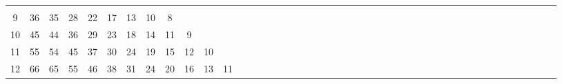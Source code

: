 \documentclass[12pt,a4paper]{amsart}
\theoremstyle{definition} %
\theoremstyle{plain} %
\begin{document}
\begin{table}[h]
{\begin{tabular}{|c|*{44}{c|}}
                               &             &             &             &             &             &             &             &             &             &             &             &             &             &             &             &             &             &             &             &             &             &             &             &             &             &             &             \\
                     9 &         36 &         35 &         28 &         22 &         17 &         13 &         10 &          8 &            &             &             &             &             &             &             &             &   
                               &             &             &             &             &             &             &             &             &             &             &             &             &             &             &             &             &             &             &             &             &             &             &             &             &             &             &             \\
                    10 &         45 &         44 &         36 &         29 &         23 &         18 &         14 &         11 &          9 &             &             &             &             &             &             &             &   
                              &             &             &             &             &             &             &             &             &             &             &             &             &             &             &             &             &             &             &             &             &             &             &             &             &             &             &             \\
                    11 &         55 &         54 &         45 &         37 &         30 &         24 &         19 &         15 &         12 &          10 &             &             &             &             &             &             &   
                              &             &             &             &             &             &             &             &             &             &             &             &             &             &             &             &             &             &             &             &             &             &             &             &             &             &             &             \\
                    12 &         66 &         65 &         55 &         46 &         38 &         31 &         24 &         20 &         16 &          13 &          11 &             &             &             &             &             &   

\end{tabular}}
\end{table}
\end{document}
